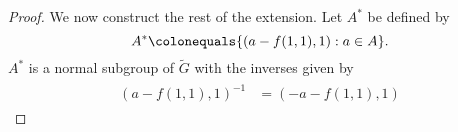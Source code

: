 \documentclass{dcthesis}
\newcommand{\mm}[1]{{\color{blue} \sf MM: [#1]}}
\newcommand{\wt}[1]{\widetilde{#1}}
\numberwithin{equation}{section}
\theoremstyle{definition}
\theoremstyle{remark}
\begin{document}
{{{\begin{proof}
      We now construct the rest of the extension.
      Let $A^*$ be defined by
      \begin{equation}
        \label{eqn:Astar}
        A^*\colonequals
        \{(a-f(1,1), 1):a\in A\}.
      \end{equation}
      $A^*$ is a normal subgroup of
      $\wt{G}$ with the inverses given by
      \begin{align}
        \label{eqn:subgroupinversesAstar}
        \begin{split}
          (a-f(1,1),1)^{-1}
          &=(-a-f(1,1), 1)
        \end{split}
      \end{align}

\end{proof}}}}
\end{document}
